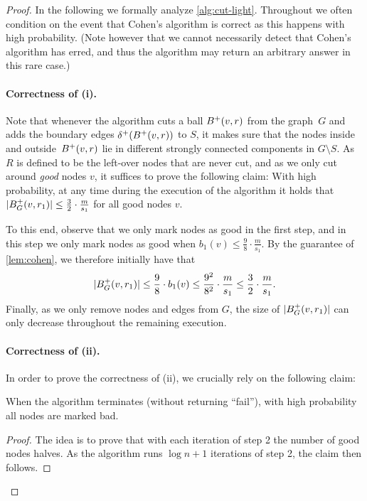 \documentclass[letterpaper,11pt]{article}
\begin{document}
\begin{proof}
In the following we formally analyze \cref{alg:cut-light}. Throughout we often condition on the event that Cohen's algorithm is correct as this happens with high probability. (Note however that we cannot necessarily detect that Cohen's algorithm has erred, and thus the algorithm may return an arbitrary answer in this rare case.)

\paragraph{Correctness of (i).}
Note that whenever the algorithm cuts a ball $B^+(v, r)$ from the graph~$G$ and adds the boundary edges $\delta^+(B^+(v, r))$ to $S$, it makes sure that the nodes inside and outside~$B^+(v, r)$ lie in different strongly connected components in $G \setminus S$. As $R$ is defined to be the left-over nodes that are never cut, and as we only cut around \emph{good} nodes $v$, it suffices to prove the following claim: With high probability, at any time during the execution of the algorithm it holds that $|B^+_G(v, r_1)| \leq \frac32 \cdot \frac{m}{s_1}$ for all good nodes $v$.

To this end, observe that we only mark nodes as good in the first step, and in this step we only mark nodes as good when $b_1(v) \leq \frac98 \cdot \frac{m}{s_1}$. By the guarantee of \cref{lem:cohen}, we therefore initially have that
\begin{equation*}
    |B^+_G(v, r_1)| \leq \frac98 \cdot b_1(v) \leq \frac{9^2}{8^2} \cdot \frac{m}{s_1} \leq \frac{3}{2} \cdot \frac{m}{s_1}.
\end{equation*}
Finally, as we only remove nodes and edges from $G$, the size of $|B^+_G(v, r_1)|$ can only decrease throughout the remaining execution.

\paragraph{Correctness of (ii).}
In order to prove the correctness of (ii), we crucially rely on the following claim:

\begin{claim}
When the algorithm terminates (without returning ``fail''), with high probability all nodes are marked bad.
\end{claim}
\begin{proof}
The idea is to prove that with each iteration of step 2 the number of good nodes halves. As the algorithm runs $\log n + 1$ iterations of step 2, the claim then follows.


\end{proof}
\end{proof}
\end{document}
